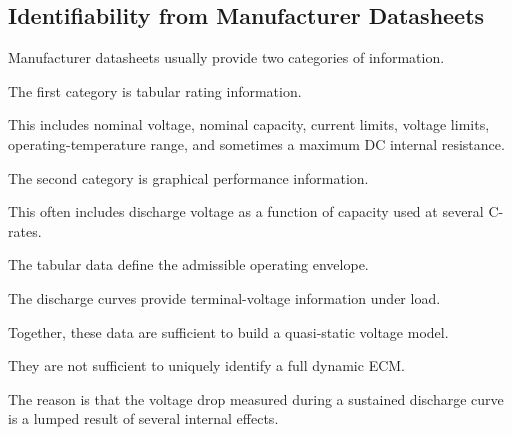 \documentclass[a4paper,12pt]{article}
\begin{document}
\subsection{Identifiability from Manufacturer Datasheets}

Manufacturer datasheets usually provide two categories of information.

The first category is tabular rating information.

This includes nominal voltage, nominal capacity, current limits, voltage limits, operating-temperature range, and sometimes a maximum DC internal resistance.

The second category is graphical performance information.

This often includes discharge voltage as a function of capacity used at several C-rates.

The tabular data define the admissible operating envelope.

The discharge curves provide terminal-voltage information under load.

Together, these data are sufficient to build a quasi-static voltage model.

They are not sufficient to uniquely identify a full dynamic ECM.

The reason is that the voltage drop measured during a sustained discharge curve is a lumped result of several internal effects.
\end{document}
